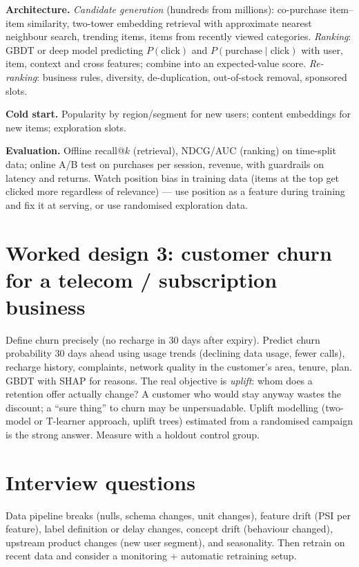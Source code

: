 \textbf{Architecture.} \emph{Candidate generation} (hundreds from millions): co-purchase item--item similarity, two-tower embedding retrieval with approximate nearest neighbour search, trending items, items from recently viewed categories. \emph{Ranking}: GBDT or deep model predicting $P(\text{click})$ and $P(\text{purchase}\mid\text{click})$ with user, item, context and cross features; combine into an expected-value score. \emph{Re-ranking}: business rules, diversity, de-duplication, out-of-stock removal, sponsored slots.

\textbf{Cold start.} Popularity by region/segment for new users; content embeddings for new items; exploration slots.

\textbf{Evaluation.} Offline recall@$k$ (retrieval), NDCG/AUC (ranking) on time-split data; online A/B test on purchases per session, revenue, with guardrails on latency and returns. Watch position bias in training data (items at the top get clicked more regardless of relevance) --- use position as a feature during training and fix it at serving, or use randomised exploration data.

\section{Worked design 3: customer churn for a telecom / subscription business}
Define churn precisely (no recharge in 30 days after expiry). Predict churn probability 30 days ahead using usage trends (declining data usage, fewer calls), recharge history, complaints, network quality in the customer's area, tenure, plan. GBDT with SHAP for reasons. The real objective is \emph{uplift}: whom does a retention offer actually change? A customer who would stay anyway wastes the discount; a ``sure thing'' to churn may be unpersuadable. Uplift modelling (two-model or T-learner approach, uplift trees) estimated from a randomised campaign is the strong answer. Measure with a holdout control group.

\section{Interview questions}
\A Data pipeline breaks (nulls, schema changes, unit changes), feature drift (PSI per feature), label definition or delay changes, concept drift (behaviour changed), upstream product changes (new user segment), and seasonality. Then retrain on recent data and consider a monitoring + automatic retraining setup.

